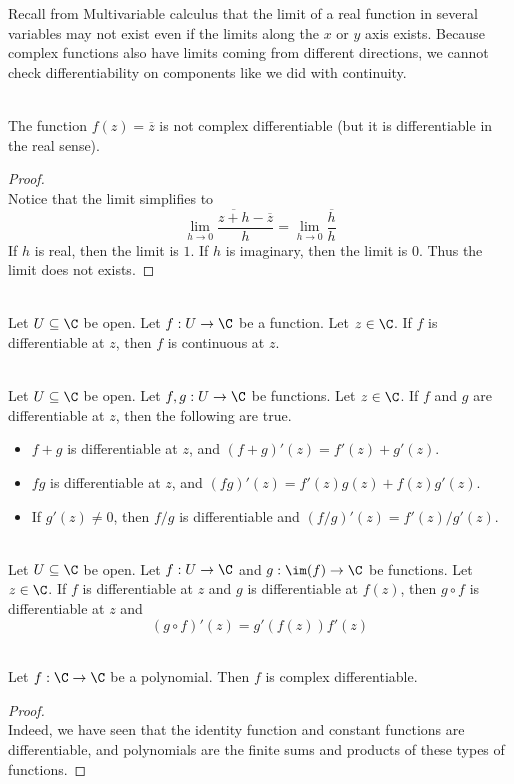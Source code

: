\documentclass[a4paper]{article}
\begin{document}
Recall from Multivariable calculus that the limit of a real function in several variables may not exist even if the limits along the $x$ or $y$ axis exists. Because complex functions also have limits coming from different directions, we cannot check differentiability on components like we did with continuity. 

\begin{eg}{}{}\\
The function $f(z)=\overline{z}$ is not complex differentiable (but it is differentiable in the real sense). 
\begin{proof}\\
Notice that the limit simplifies to $$\lim_{h\to 0}\frac{\overline{z+h}-\overline{z}}{h}=\lim_{h\to 0}\frac{\overline{h}}{h}$$ If $h$ is real, then the limit is $1$. If $h$ is imaginary, then the limit is $0$. Thus the limit does not exists. 
\end{proof}
\end{eg}

\begin{prp}{}{}\\
Let $U\subseteq\C$ be open. Let $f:U\to\C$ be a function. Let $z\in\C$. If $f$ is differentiable at $z$, then $f$ is continuous at $z$. 
\end{prp}

\begin{prp}{}{}\\
Let $U\subseteq\C$ be open. Let $f,g:U\to\C$ be functions. Let $z\in\C$. If $f$ and $g$ are differentiable at $z$, then the following are true. 
\begin{itemize}
\item $f+g$ is differentiable at $z$, and $(f+g)'(z)=f'(z)+g'(z)$. 
\item $fg$ is differentiable at $z$, and $(fg)'(z)=f'(z)g(z)+f(z)g'(z)$. 
\item If $g'(z)\neq 0$, then $f/g$ is differentiable and $(f/g)'(z)=f'(z)/g'(z)$. 
\end{itemize}
\end{prp}

\begin{prp}{}{}\\
Let $U\subseteq\C$ be open. Let $f:U\to\C$ and $g:\im(f)\to\C$ be functions. Let $z\in\C$. If $f$ is differentiable at $z$ and $g$ is differentiable at $f(z)$, then $g\circ f$ is differentiable at $z$ and $$(g\circ f)'(z)=g'(f(z))f'(z)$$
\end{prp}

\begin{eg}{}{}\\
Let $f:\C\to\C$ be a polynomial. Then $f$ is complex differentiable. 
\begin{proof}\\
Indeed, we have seen that the identity function and constant functions are differentiable, and polynomials are the finite sums and products of these types of functions. 
\end{proof}
\end{eg}
\end{document}
